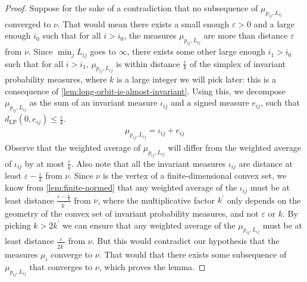 \begin{proof}
  Suppose for the sake of a contradiction that no subsequence of $\mu_{p_{ij}, L_{ij}}$ converged to $\nu$.
  That would mean there exists a small enough $\varepsilon > 0$ and a large enough $i_0$ such that for all $i > i_0$, the measures $\mu_{p_{ij}, L_{ij}}$ are more than distance $\varepsilon$ from $\nu$.
  Since $\min_{j} L_{ij}$ goes to $\infty$, there exists some other large enough $i_1 > i_0$ such that for all $i > i_1$, $\mu_{p_{ij}, L_{ij}}$ is within distance $\frac{\varepsilon}{k}$ of the simplex of invariant probability measures, where $k$ is a large integer we will pick later: this is a consequence of \autoref{lem:long-orbit-is-almost-invariant}.
  Using this, we decompose $\mu_{p_{ij}, L_{ij}}$ as the sum of an invariant measure $\iota_{ij}$ and a signed measure $e_{ij}$, such that $d_{\mathrm{LP}}(0, e_{ij}) \leq \frac{\varepsilon}{k}$.
  \begin{align*}
    \mu_{p_{ij}, L_{ij}} = \iota_{ij} + e_{ij}
  \end{align*}
  Observe that the weighted average of $\mu_{p_{ij}, L_{ij}}$ will differ from the weighted average of $\iota_{ij}$ by at most $\frac{\varepsilon}{k}$.
  Also note that all the invariant measures $\iota_{ij}$ are distance at least $\varepsilon - \frac{\varepsilon}{k}$ from $\nu$.
  Since $\nu$ is the vertex of a finite-dimensional convex set, we know from \autoref{lem:finite-normed} that any weighted average of the $\iota_{ij}$ must be at least distance $\frac{\varepsilon - \frac{\varepsilon}{k}}{k^{\prime}}$ from $\nu$, where the multiplicative factor $k^{\prime}$ only depends on the geometry of the convex set of invariant probability measures, and not $\varepsilon$ or $k$.
  By picking $k > 2k^{\prime}$ we can ensure that any weighted average of the $\mu_{p_{ij}, L_{ij}}$ must be at least distance $\frac{\varepsilon}{2k^{\prime}}$ from $\nu$.
  But this would contradict our hypothesis that the measures $\mu_i$ converge to $\nu$.
  That would that there exists some subsequence of $\mu_{p_{ij}, L_{ij}}$ that converges to $\nu$, which proves the lemma.
\end{proof}

